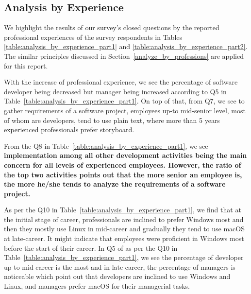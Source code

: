 \subsection{Analysis by Experience}\label{analyze_by_experience}

We highlight the results of our survey's closed questions by the reported professional experiences of the survey respondents in Tables \ref{table:analysis_by_experience_part1} and \ref{table:analysis_by_experience_part2}. The similar principles discussed in Section~\ref{analyze_by_professions} are applied for this report.




With the increase of professional experience, we see the percentage of software
developer being decreased but manager being increased according to Q5 in
Table~\ref{table:analysis_by_experience_part1}. On top of that, from Q7, we see
to gather requirements of a software project, employees up-to mid-senior level,
most of whom are developers, tend to use plain text, where more than 5 years
experienced professionals prefer storyboard.

From the Q8 in Table~\ref{table:analysis_by_experience_part1}, we see
\bf{implementation among all other development activities being the main concern for
all levels of experienced employees. However, the ratio of the top two
activities points out that the more senior an employee is, the more he/she tends
to analyze the requirements of a software project.}

As per the Q10 in Table~\ref{table:analysis_by_experience_part1}, we find that at the initial stage of career, professionals are inclined to prefer Windows most and then they mostly use Linux in mid-career and gradually they tend to use macOS at late-career. It might indicate that employees were proficient in Windows most before the start of their career. In Q5 of as per the Q10 in Table~\ref{table:analysis_by_experience_part1}, we see the percentage of developer up-to mid-career is the most and in late-career, the percentage of managers is noticeable which point out that developers are inclined to use Windows and Linux, and managers prefer macOS for their managerial tasks.

